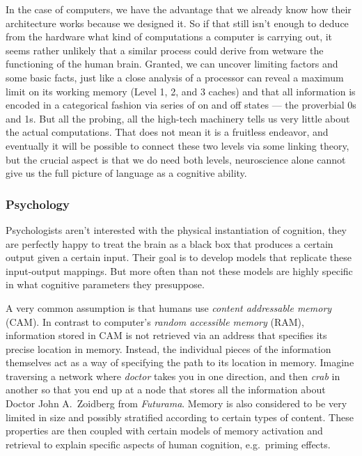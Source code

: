 In the case of computers, we have the advantage that we already know how their architecture works because we designed it.
So if that still isn't enough to deduce from the hardware what kind of computations a computer is carrying out, it seems rather unlikely that a similar process could derive from wetware the functioning of the human brain.
Granted, we can uncover limiting factors and some basic facts, just like a close analysis of a processor can reveal a maximum limit on its working memory (Level 1, 2, and 3 caches) and that all information is encoded in a categorical fashion via series of on and off states --- the proverbial 0s and 1s.
But all the probing, all the high-tech machinery tells us very little about the actual computations.
That does not mean it is a fruitless endeavor, and eventually it will be possible to connect these two levels via some linking theory, but the crucial aspect is that we do need both levels, neuroscience alone cannot give us the full picture of language as a cognitive ability.


\subsubsection{Psychology}

Psychologists aren't interested with the physical instantiation of cognition, they are perfectly happy to treat the brain as a black box that produces a certain output given a certain input.
Their goal is to develop models that replicate these input-output mappings.
But more often than not these models are highly specific in what cognitive parameters they presuppose.

A very common assumption is that humans use \emph{content addressable memory} (CAM).
In contrast to computer's \emph{random accessible memory} (RAM), information stored in CAM is not retrieved via an address that specifies its precise location in memory.
Instead, the individual pieces of the information themselves act as a way of specifying the path to its location in memory.
Imagine traversing a network where \emph{doctor} takes you in one direction, and then \emph{crab} in another so that you end up at a node that stores all the information about Doctor John A.\ Zoidberg from \emph{Futurama}.
Memory is also considered to be very limited in size and possibly stratified according to certain types of content.
These properties are then coupled with certain models of memory activation and retrieval to explain specific aspects of human cognition, e.g.\ priming effects.

